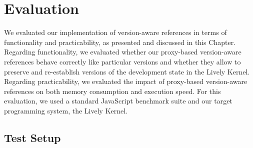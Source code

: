 \chapter{Evaluation} \label{chapter:EVALUATION}

We evaluated our implementation of version-aware references in terms of functionality and practicability, as presented and discussed in this Chapter.
Regarding functionality, we evaluated whether our proxy-based version-aware references behave correctly like particular versions and whether they allow to preserve and re-establish versions of the development state in the Lively Kernel.
Regarding practicability, we evaluated the impact of proxy-based version-aware references on both memory consumption and execution speed.
For this evaluation, we used a standard JavaScript benchmark suite and our target programming system, the Lively Kernel.

% 






\section{Test Setup}

